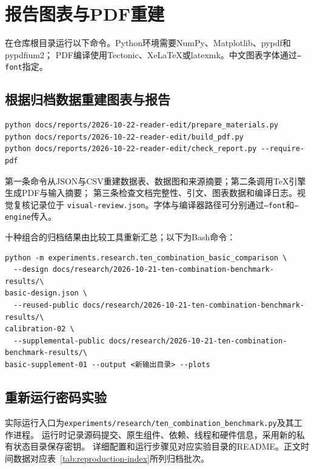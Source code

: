 \section{报告图表与PDF重建}

在仓库根目录运行以下命令。Python环境需要NumPy、Matplotlib、pypdf和pypdfium2；
PDF编译使用Tectonic、XeLaTeX或latexmk。中文图表字体通过\texttt{--font}指定。

\subsection{根据归档数据重建图表与报告}
\begingroup\footnotesize
\begin{verbatim}
python docs/reports/2026-10-22-reader-edit/prepare_materials.py
python docs/reports/2026-10-22-reader-edit/build_pdf.py
python docs/reports/2026-10-22-reader-edit/check_report.py --require-pdf
\end{verbatim}
\endgroup

第一条命令从JSON与CSV重建数据表、数据图和来源摘要；第二条调用TeX引擎生成PDF与输入摘要；
第三条检查文档完整性、引文、图表数据和编译日志。视觉复核记录位于
\nolinkurl{visual-review.json}。字体与编译器路径可分别通过\texttt{--font}和\texttt{--engine}传入。

十种组合的归档结果由比较工具重新汇总；以下为Bash命令：
\begingroup\footnotesize
\begin{verbatim}
python -m experiments.research.ten_combination_basic_comparison \
  --design docs/research/2026-10-21-ten-combination-benchmark-results/\
basic-design.json \
  --reused-public docs/research/2026-10-21-ten-combination-benchmark-results/\
calibration-02 \
  --supplemental-public docs/research/2026-10-21-ten-combination-benchmark-results/\
basic-supplement-01 --output <新输出目录> --plots
\end{verbatim}
\endgroup

\subsection{重新运行密码实验}
实际运行入口为\nolinkurl{experiments/research/ten_combination_benchmark.py}及其工作进程。
运行时记录源码提交、原生组件、依赖、线程和硬件信息，采用新的私有状态目录保存密钥。
详细配置和运行步骤见对应实验目录的README。正文时间数据对应表~\ref{tab:reproduction-index}所列归档批次。
